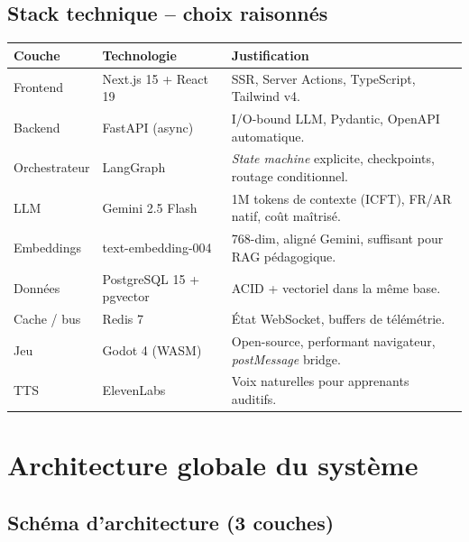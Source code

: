 \documentclass[11pt,a4paper]{article}
\begin{document}
\subsection{Stack technique -- choix raisonnés}

\begin{center}
\small
\begin{tabular}{@{}p{2.4cm}p{3.8cm}p{8.6cm}@{}}
\toprule
\textbf{Couche} & \textbf{Technologie} & \textbf{Justification} \\
\midrule
Frontend      & Next.js 15 + React 19    & SSR, Server Actions, TypeScript, Tailwind v4.\\
Backend       & FastAPI (async)          & I/O-bound LLM, Pydantic, OpenAPI automatique.\\
Orchestrateur & LangGraph                & \textit{State machine} explicite, checkpoints, routage conditionnel.\\
LLM           & Gemini 2.5 Flash         & 1M tokens de contexte (ICFT), FR/AR natif, coût maîtrisé.\\
Embeddings    & text-embedding-004       & 768-dim, aligné Gemini, suffisant pour RAG pédagogique.\\
Données       & PostgreSQL 15 + pgvector & ACID + vectoriel dans la même base.\\
Cache / bus   & Redis 7                  & État WebSocket, buffers de télémétrie.\\
Jeu           & Godot 4 (WASM)           & Open-source, performant navigateur, \textit{postMessage} bridge.\\
TTS           & ElevenLabs               & Voix naturelles pour apprenants auditifs.\\
\bottomrule
\end{tabular}
\end{center}

\newpage

\section{Architecture globale du système}

\subsection{Schéma d'architecture (3 couches)}
\end{document}

